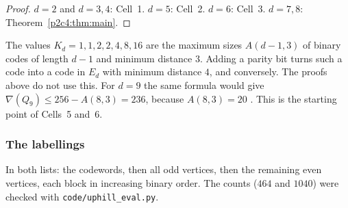 \begin{proof}
$d=2$ and $d=3,4$: Cell~1. $d=5$: Cell~2. $d=6$: Cell~3. $d=7,8$: Theorem~\ref{p2c4:thm:main}.
\end{proof}

\begin{remark}
The values $K_d=1,1,2,2,4,8,16$ are the maximum sizes $A(d-1,3)$ of binary codes of length $d-1$
and minimum distance $3$. Adding a parity bit turns such a code into a code in $E_d$ with minimum
distance $4$, and conversely. The proofs above do not use this. For $d=9$ the same formula would
give $\nabla(Q_9)\le256-A(8,3)=236$, because $A(8,3)=20$ \cite{MS77}. This is the starting point of Cells~5
and~6.
\end{remark}

\subsubsection{The labellings}\label{p2c4:sec:lab}

In both lists: the codewords, then all odd vertices, then the remaining even vertices, each
block in increasing binary order. The counts ($464$ and $1040$) were checked with
\texttt{code/uphill\_eval.py}.

